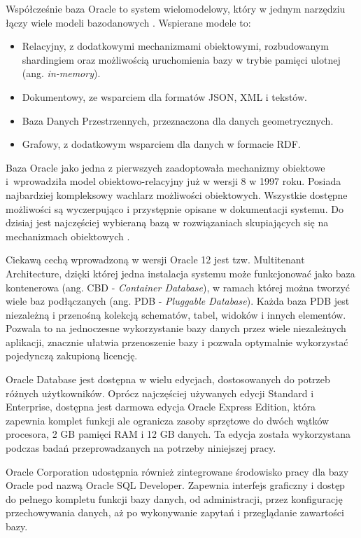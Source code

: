 \documentclass[a4paper,twoside,12pt]{book}
\begin{document}
Współcześnie baza Oracle to system wielomodelowy, który w jednym narzędziu łączy wiele modeli bazodanowych \cite{bib:oracle-multimodel-database}. Wspierane modele to:
\begin{itemize}
\item Relacyjny, z dodatkowymi mechanizmami obiektowymi, rozbudowanym shardingiem oraz możliwością uruchomienia bazy w trybie pamięci ulotnej (ang. \textit{in-memory}).
\item Dokumentowy, ze wsparciem dla formatów JSON, XML i tekstów.
\item Baza Danych Przestrzennych, przeznaczona dla danych geometrycznych.
\item Grafowy, z dodatkowym wsparciem dla danych w formacie RDF.
\end{itemize}

Baza Oracle jako jedna z pierwszych zaadoptowała mechanizmy obiektowe i~wprowadziła model obiektowo-relacyjny już w wersji 8 w 1997 roku. Posiada najbardziej kompleksowy wachlarz możliwości obiektowych. Wszystkie dostępne możliwości są wyczerpująco i przystępnie opisane w dokumentacji systemu. Do dzisiaj jest najczęściej wybieraną bazą w rozwiązaniach skupiających się na mechanizmach obiektowych \cite{bib:oracle-database-concepts}.

Ciekawą cechą wprowadzoną w wersji Oracle 12 jest tzw. Multitenant Architecture, dzięki której jedna instalacja systemu może funkcjonować jako baza kontenerowa (ang. CBD - \textit{Container Database}), w ramach której można tworzyć wiele baz podłączanych (ang. PDB - \textit{Pluggable Database}). Każda baza PDB jest niezależną i przenośną kolekcją schematów, tabel, widoków i innych elementów. Pozwala to na jednoczesne wykorzystanie bazy danych przez wiele niezależnych aplikacji, znacznie ułatwia przenoszenie bazy i pozwala optymalnie wykorzystać pojedynczą zakupioną licencję.

Oracle Database jest dostępna w wielu edycjach, dostosowanych do potrzeb różnych użytkowników. Oprócz najczęściej używanych edycji Standard i Enterprise, dostępna jest darmowa edycja Oracle Express Edition, która zapewnia komplet funkcji ale ogranicza zasoby sprzętowe do dwóch wątków procesora, 2 GB pamięci RAM i 12 GB danych. Ta edycja została wykorzystana podczas badań przeprowadzanych na potrzeby niniejszej pracy.

Oracle Corporation udostępnia również zintegrowane środowisko pracy dla bazy Oracle pod nazwą Oracle SQL Developer. Zapewnia interfejs graficzny i dostęp do pełnego kompletu funkcji bazy danych, od administracji, przez konfigurację przechowywania danych, aż po wykonywanie zapytań i przeglądanie zawartości bazy. 
\end{document}
